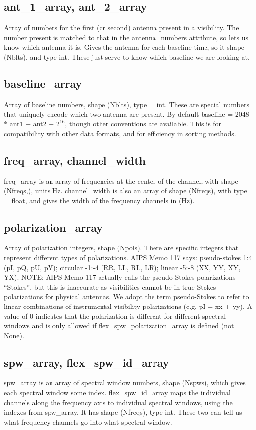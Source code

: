 \documentclass[12pt]{article}
\begin{document}
\subsection{ant\_1\_array, ant\_2\_array}
Array of numbers for the first (or second) antenna present in a visibility. 
The number present is matched to that in the antenna\_numbers attribute, so lets us know which antenna it is.
Gives the antenna for each baseline-time, so it shape (Nblts), and type int.
These just serve to know which baseline we are looking at.


\subsection{baseline\_array}
Array of baseline numbers, shape (Nblts), type = int.
These are special numbers that uniquely encode which two antenna are present.
By default baseline = 2048 * ant1 + ant2 + $2^{16}$, though other conventions are available. 
This is for compatibility with other data formats, and for efficiency in sorting methods.


\subsection{freq\_array, channel\_width}
freq\_array is an array of frequencies at the center of the channel, with shape (Nfreqs,), units Hz.
channel\_width is also an array of shape (Nfreqs), with type = float, and gives the width of the frequency channels in (Hz).


\subsection{polarization\_array}
Array of polarization integers, shape (Npols).
There are specific integers that represent different types of polarizations.
AIPS Memo 117 says: pseudo-stokes 1:4 (pI, pQ, pU, pV); circular -1:-4 (RR, LL, RL, LR); linear -5:-8 (XX, YY, XY, YX). 
NOTE: AIPS Memo 117 actually calls the pseudo-Stokes polarizations “Stokes”, but this is inaccurate as visibilities cannot be in true Stokes polarizations for physical antennas.
We adopt the term pseudo-Stokes to refer to linear combinations of instrumental visibility polarizations (e.g. pI = xx + yy). 
A value of 0 indicates that the polarization is different for different spectral windows and is only allowed if flex\_spw\_polarization\_array is defined (not None).


\subsection{spw\_array, flex\_spw\_id\_array}
spw\_array is an array of spectral window numbers, shape (Nspws), which gives each spectral window some index.
flex\_spw\_id\_array maps the individual channels along the frequency axis to individual spectral windows,
using the indexes from spw\_array. It has shape (Nfreqs), type int.
These two can tell us what frequency channels go into what spectral window.
\end{document}

